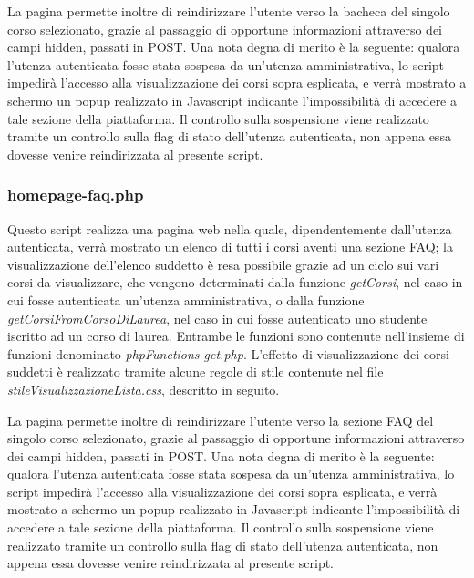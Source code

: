\documentclass [a4paper,11pt]{book}
\begin{document}
La pagina permette inoltre di reindirizzare l'utente verso la bacheca del singolo corso selezionato, grazie al passaggio di opportune informazioni attraverso dei campi hidden, passati in POST. Una nota degna di merito è la seguente: qualora l'utenza autenticata fosse stata sospesa da un'utenza amministrativa, lo script impedirà l'accesso alla visualizzazione dei corsi sopra esplicata, e verrà mostrato a schermo un popup realizzato in Javascript indicante l'impossibilità di accedere a tale sezione della piattaforma. Il controllo sulla sospensione viene realizzato tramite un controllo sulla flag di stato dell'utenza autenticata, non appena essa dovesse venire reindirizzata al presente script.

\medskip


\subsubsection{homepage-faq.php}

Questo script realizza una pagina web nella quale, dipendentemente dall'utenza autenticata, verrà mostrato un elenco di tutti i corsi aventi una sezione FAQ; la visualizzazione dell'elenco suddetto è resa possibile grazie ad un ciclo sui vari corsi da visualizzare, che vengono determinati dalla funzione \emph{getCorsi}, nel caso in cui fosse autenticata un'utenza amministrativa, o dalla funzione \emph{getCorsiFromCorsoDiLaurea}, nel caso in cui fosse autenticato uno studente iscritto ad un corso di laurea. Entrambe le funzioni sono contenute nell'insieme di funzioni denominato \emph{phpFunctions-get.php}. L'effetto di visualizzazione dei corsi suddetti è realizzato tramite alcune regole di stile contenute nel file \emph{stileVisualizzazioneLista.css}, descritto in seguito.

La pagina permette inoltre di reindirizzare l'utente verso la sezione FAQ del singolo corso selezionato, grazie al passaggio di opportune informazioni attraverso dei campi hidden, passati in POST. Una nota degna di merito è la seguente: qualora l'utenza autenticata fosse stata sospesa da un'utenza amministrativa, lo script impedirà l'accesso alla visualizzazione dei corsi sopra esplicata, e verrà mostrato a schermo un popup realizzato in Javascript indicante l'impossibilità di accedere a tale sezione della piattaforma. Il controllo sulla sospensione viene realizzato tramite un controllo sulla flag di stato dell'utenza autenticata, non appena essa dovesse venire reindirizzata al presente script.

\medskip
\end{document}
